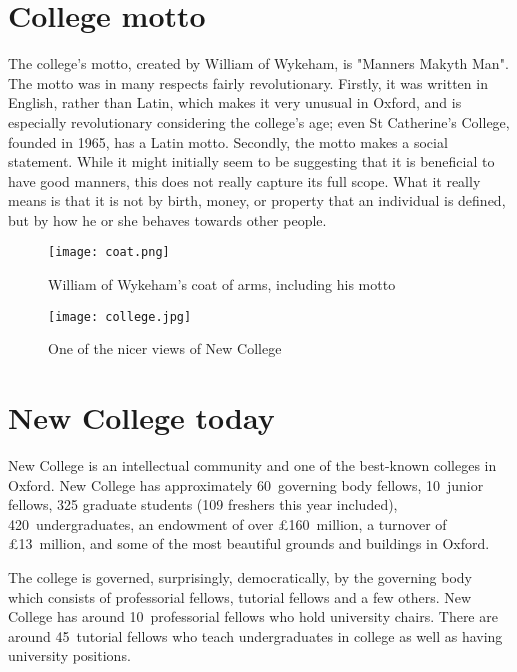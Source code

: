 \section{College motto}

The college's motto, created by William of Wykeham, is "Manners Makyth Man". The
motto was in many respects fairly revolutionary. Firstly, it was written in English, rather than Latin, which makes it very unusual in Oxford, and is especially revolutionary considering the college's age; even St Catherine's College, founded in 1965, has a Latin motto. Secondly, the motto makes a social statement. While it might initially seem to be suggesting that it is beneficial to have good manners, this does not really capture its full scope. What it really means is that it is not by birth, money, or property that an individual is defined, but by how he or she behaves towards other people.

\begin{figure}[htbp]
\centering
		\begin{minipage}{0.48\textwidth}
			\centering
                \texttt{[image: coat.png]}
                \caption[]{William of
                Wykeham's coat of arms, including his motto}
                \label{fig:coat}
        \end{minipage}%
        \quad
        \begin{minipage}{0.48\textwidth}
        	\centering
                \texttt{[image: college.jpg]}
                \caption[]{One of the nicer views
				of New College}
				\label{fig:college}
        \end{minipage}%
\end{figure}

\section{New College today}

New College is an intellectual community and one of the best-known colleges in
Oxford. New College has approximately 60~governing body fellows, 10~junior
fellows, 325 graduate students (109 freshers this year included),
420~undergraduates, an endowment of over \pounds160~million, a turnover of
\pounds13~million, and some of the most beautiful grounds and buildings in Oxford.

The college is governed, surprisingly, democratically, by the governing body
which consists of professorial fellows, tutorial fellows and a few others. New College has around 10~professorial fellows who hold university chairs. There are around 45~tutorial fellows who teach undergraduates in college as well as having university positions.


